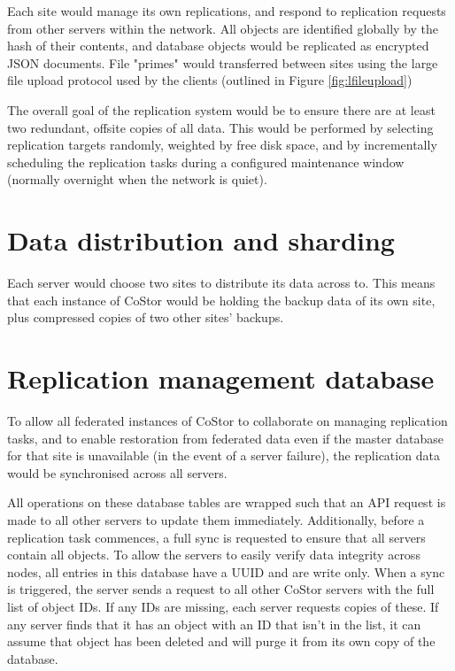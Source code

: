 \documentclass[bsc,frontabs,twoside,singlespacing,parskip,deptreport]{infthesis}     %
\begin{document}
Each site would manage its own replications, and respond to replication requests from other servers
within the network. All objects are identified globally by the hash of their contents, and 
database objects would be replicated as encrypted JSON documents. File "primes" would transferred
between sites using the large file upload protocol used by the clients (outlined in Figure \ref{fig:lfileupload})

The overall goal of the replication system would be to ensure there are at least two redundant, offsite
copies of all data. This would be performed by selecting replication targets randomly, weighted by 
free disk space, and by incrementally scheduling the replication tasks during a configured
maintenance window (normally overnight when the network is quiet).

\section{Data distribution and sharding}

Each server would choose two sites to distribute its data across to. This means that each instance
of CoStor would be holding the backup data of its own site, plus compressed copies of two other
sites' backups.

\section{Replication management database}

To allow all federated instances of CoStor to collaborate on managing replication tasks, and to
enable restoration from federated data even if the master database for that site is unavailable 
(in the event of a server failure), the replication data would be synchronised across all servers.

All operations on these database tables are wrapped such that an API request is made to all other
servers to update them immediately. Additionally, before a replication task commences, a full
sync is requested to ensure that all servers contain all objects. To allow the servers to easily
verify data integrity across nodes, all entries in this database have a UUID and are write only. 
When a sync is triggered, the server sends a request to all other CoStor servers with the full 
list of object IDs. If any IDs are missing, each server requests copies of these. If any server
finds that it has an object with an ID that isn't in the list, it can assume that object has been 
deleted and will purge it from its own copy of the database.
\end{document}
